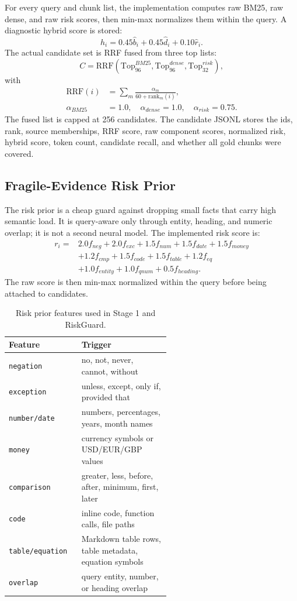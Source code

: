 \documentclass[10pt,twocolumn]{article}
\begin{document}
For every query and chunk list, the implementation computes raw BM25, raw dense, and raw risk scores, then min-max normalizes them within the query. A diagnostic hybrid score is stored:
\[
h_i = 0.45 \hat{b}_i + 0.45 \hat{d}_i + 0.10 \hat{r}_i.
\]
The actual candidate set is RRF fused from three top lists:
\[
C = \mathrm{RRF}(\mathrm{Top}_{96}^{BM25},\mathrm{Top}_{96}^{dense},\mathrm{Top}_{32}^{risk}),
\]
with
\[
\begin{aligned}
\mathrm{RRF}(i)&=\sum_m \frac{\alpha_m}{60+\mathrm{rank}_m(i)},\\
\alpha_{BM25}&=1.0,\quad \alpha_{dense}=1.0,\quad \alpha_{risk}=0.75.
\end{aligned}
\]
The fused list is capped at 256 candidates. The candidate JSONL stores the ids, rank, source memberships, RRF score, raw component scores, normalized risk, hybrid score, token count, candidate recall, and whether all gold chunks were covered.

\subsection{Fragile-Evidence Risk Prior}
The risk prior is a cheap guard against dropping small facts that carry high semantic load. It is query-aware only through entity, heading, and numeric overlap; it is not a second neural model. The implemented risk score is:
\[
\begin{aligned}
r_i ={}&2.0 f_{neg}+2.0 f_{exc}+1.5 f_{num}+1.5 f_{date}+1.5 f_{money}\\
&+1.2 f_{cmp}+1.5 f_{code}+1.5 f_{table}+1.2 f_{eq}\\
&+1.0 f_{entity}+1.0 f_{qnum}+0.5 f_{heading}.
\end{aligned}
\]
The raw score is then min-max normalized within the query before being attached to candidates.

\begin{table}[h]
\centering
\small
\begin{tabular}{lp{0.55\linewidth}}
\toprule
Feature & Trigger\\
\midrule
\texttt{negation} & no, not, never, cannot, without\\
\texttt{exception} & unless, except, only if, provided that\\
\texttt{number/date} & numbers, percentages, years, month names\\
\texttt{money} & currency symbols or USD/EUR/GBP values\\
\texttt{comparison} & greater, less, before, after, minimum, first, later\\
\texttt{code} & inline code, function calls, file paths\\
\texttt{table/equation} & Markdown table rows, table metadata, equation symbols\\
\texttt{overlap} & query entity, number, or heading overlap\\
\bottomrule
\end{tabular}
\caption{Risk prior features used in Stage 1 and RiskGuard.}
\label{tab:risk}
\end{table}
\end{document}
